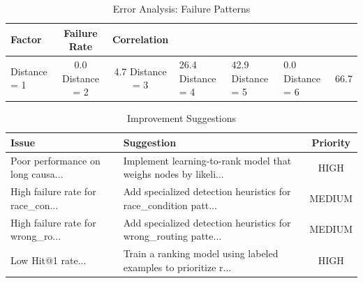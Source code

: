
\begin{table}[t]
\centering
\caption{Error Analysis: Failure Patterns}
\label{tab:error_analysis}
\begin{tabular}{lcc}
\toprule
\textbf{Factor} & \textbf{Failure Rate} & \textbf{Correlation} \\
\midrule
Distance = 1 & 0.0%
Distance = 2 & 4.7%
Distance = 3 & 26.4%
Distance = 4 & 42.9%
Distance = 5 & 0.0%
Distance = 6 & 66.7%

\bottomrule
\end{tabular}
\end{table}

\begin{table}[t]
\centering
\caption{Improvement Suggestions}
\label{tab:improvements}
\begin{tabular}{lp{8cm}c}
\toprule
\textbf{Issue} & \textbf{Suggestion} & \textbf{Priority} \\
\midrule
Poor performance on long causa... & Implement learning-to-rank model that weighs nodes by likeli... & HIGH \\
High failure rate for race_con... & Add specialized detection heuristics for race_condition patt... & MEDIUM \\
High failure rate for wrong_ro... & Add specialized detection heuristics for wrong_routing patte... & MEDIUM \\
Low Hit@1 rate... & Train a ranking model using labeled examples to prioritize r... & HIGH \\

\bottomrule
\end{tabular}
\end{table}
